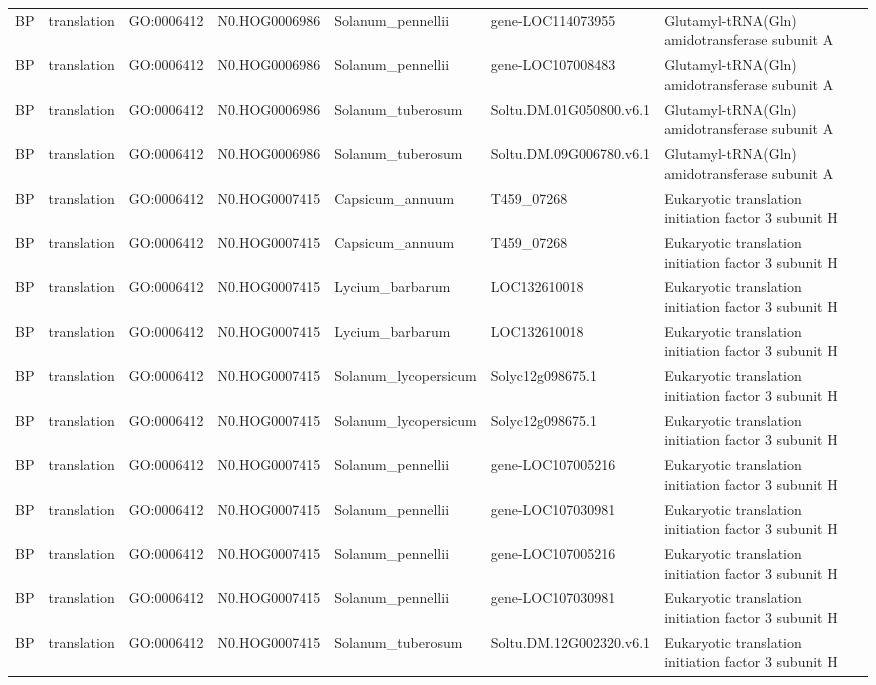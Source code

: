 \begin{table}
\begin{tabular}[t]{lllllll}
BP & translation & GO:0006412 & N0.HOG0006986 & Solanum\_pennellii & gene-LOC114073955 & Glutamyl-tRNA(Gln) amidotransferase subunit A\\
BP & translation & GO:0006412 & N0.HOG0006986 & Solanum\_pennellii & gene-LOC107008483 & Glutamyl-tRNA(Gln) amidotransferase subunit A\\
BP & translation & GO:0006412 & N0.HOG0006986 & Solanum\_tuberosum & Soltu.DM.01G050800.v6.1 & Glutamyl-tRNA(Gln) amidotransferase subunit A\\
BP & translation & GO:0006412 & N0.HOG0006986 & Solanum\_tuberosum & Soltu.DM.09G006780.v6.1 & Glutamyl-tRNA(Gln) amidotransferase subunit A\\
BP & translation & GO:0006412 & N0.HOG0007415 & Capsicum\_annuum & T459\_07268 & Eukaryotic translation initiation factor 3 subunit H\\
BP & translation & GO:0006412 & N0.HOG0007415 & Capsicum\_annuum & T459\_07268 & Eukaryotic translation initiation factor 3 subunit H\\
BP & translation & GO:0006412 & N0.HOG0007415 & Lycium\_barbarum & LOC132610018 & Eukaryotic translation initiation factor 3 subunit H\\
BP & translation & GO:0006412 & N0.HOG0007415 & Lycium\_barbarum & LOC132610018 & Eukaryotic translation initiation factor 3 subunit H\\
BP & translation & GO:0006412 & N0.HOG0007415 & Solanum\_lycopersicum & Solyc12g098675.1 & Eukaryotic translation initiation factor 3 subunit H\\
BP & translation & GO:0006412 & N0.HOG0007415 & Solanum\_lycopersicum & Solyc12g098675.1 & Eukaryotic translation initiation factor 3 subunit H\\
BP & translation & GO:0006412 & N0.HOG0007415 & Solanum\_pennellii & gene-LOC107005216 & Eukaryotic translation initiation factor 3 subunit H\\
BP & translation & GO:0006412 & N0.HOG0007415 & Solanum\_pennellii & gene-LOC107030981 & Eukaryotic translation initiation factor 3 subunit H\\
BP & translation & GO:0006412 & N0.HOG0007415 & Solanum\_pennellii & gene-LOC107005216 & Eukaryotic translation initiation factor 3 subunit H\\
BP & translation & GO:0006412 & N0.HOG0007415 & Solanum\_pennellii & gene-LOC107030981 & Eukaryotic translation initiation factor 3 subunit H\\
BP & translation & GO:0006412 & N0.HOG0007415 & Solanum\_tuberosum & Soltu.DM.12G002320.v6.1 & Eukaryotic translation initiation factor 3 subunit H\\

\end{tabular}
\end{table}
